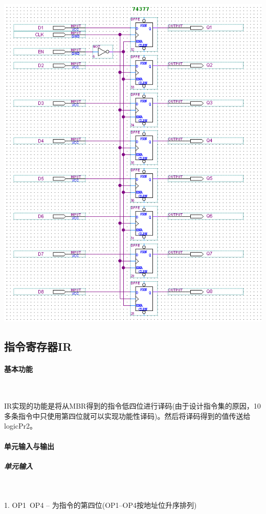 \documentclass[UTF8]{ctexart}
\begin{document}
    \includegraphics[width=1.0\textwidth]{./img/MAR,MBR原理图.png}

    \subsection{指令寄存器IR}
    \paragraph{基本功能}

    ~

    IR实现的功能是将从MBR得到的指令低四位进行译码(由于设计指令集的原因，10多条指令中只使用第四位就可以实现功能性译码)。然后将译码得到的值传送给logicPr2。

    \paragraph{单元输入与输出}

    \subparagraph{单元输入}

    ~

    1. OP1~OP4 -- 为指令的第四位(OP1--OP4按地址位升序排列)
\end{document}

